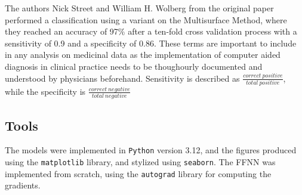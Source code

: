 The authors Nick Street and William H. Wolberg from the original paper performed a classification using a variant on the Multisurface 
Method, where they reached an accuracy of 97$\%$ after a ten-fold cross validation process with a sensitivity of 0.9 and a specificity of 0.86. 
These terms are important to include in any analysis on medicinal data as the implementation of computer aided diagnosis in clinical practice 
needs to be thoughourly documented and understood by physicians beforehand. Sensitivity is described as $\frac{correct\ positive}{total\ positive}$, 
while the specificity is $\frac{correct\ negative}{total\ negative}$
%
\subsection{Tools}\label{ssec:tools}
The models were implemented in \verb|Python| version 3.12, and the figures produced using the \verb|matplotlib| library, 
and stylized using \verb|seaborn|. The FFNN was implemented from scratch, using the \verb|autograd| library \cite{maclaurin2015:autograd} 
for computing the gradients.